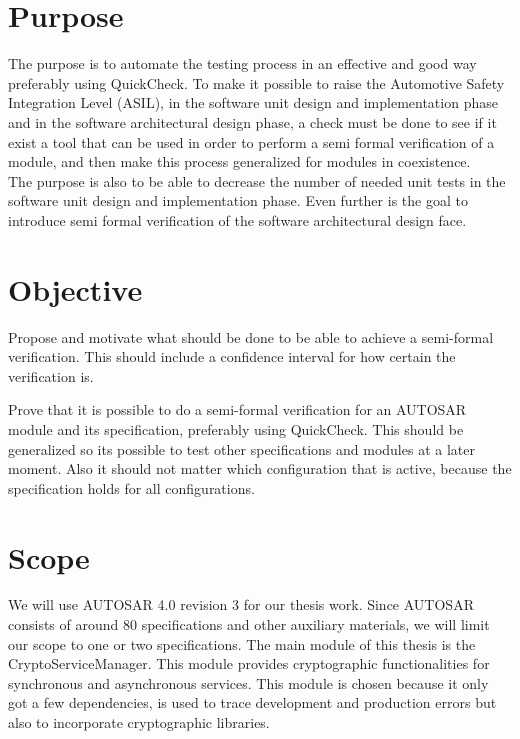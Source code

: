 \documentclass[11pt,a4paper]{report}
\begin{document}
\section{Purpose}
The purpose is to automate the testing process in an effective and good way
preferably using QuickCheck. To make it possible to raise the Automotive Safety
Integration Level (ASIL), in the software unit design and implementation phase
and in the software architectural design phase, a check must be done to see if
it exist a tool that can be used in order to perform a semi formal verification
of a module, and then make this process generalized for modules in
coexistence.\\

The purpose is also to be able to decrease the number of needed unit tests in
the software unit design and implementation phase. Even further is the goal to
introduce semi formal verification of the software architectural design face.

\section{Objective}
Propose and motivate what should be done to be able to achieve a semi-formal
verification. This should include a confidence interval for how certain the
verification is.

Prove that it is possible to do a semi-formal verification for an AUTOSAR module
and its specification, preferably using QuickCheck. This should be generalized
so its possible to test other specifications and modules at a later moment.
Also it should not matter which configuration that is active, because the
specification holds for all configurations.

\section{Scope}
We will use AUTOSAR 4.0 revision 3 for our thesis work.
Since AUTOSAR consists of around 80 specifications and other auxiliary
materials\cite{AUTOSAR:URL}, we will limit our scope to one or two
specifications. The main module of this thesis is the CryptoServiceManager. This
module provides cryptographic functionalities for synchronous and asynchronous
services. This module is chosen because it only got a few dependencies, is used to trace
development and production errors but also to incorporate cryptographic
libraries.
\end{document}
